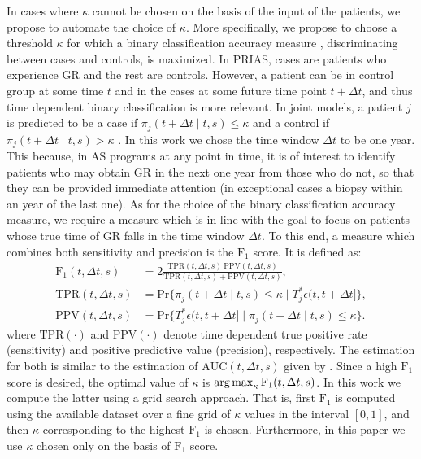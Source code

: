 In cases where $\kappa$ cannot be chosen on the basis of the input of the patients, we propose to automate the choice of $\kappa$. More specifically, we propose to choose a threshold $\kappa$ for which a binary classification accuracy measure \citep{lopez2014optimalcutpoints}, discriminating between cases and controls, is maximized. In PRIAS, cases are patients who experience GR and the rest are controls. However, a patient can be in control group at some time $t$ and in the cases at some future time point $t + \Delta t$, and thus time dependent binary classification is more relevant. In joint models, a patient $j$ is predicted to be a case if $\pi_j(t + \Delta t \mid t,s) \leq \kappa$ and a control if $\pi_j(t + \Delta t \mid t,s) > \kappa$ \citep*{rizopoulosJMbayes, landmarking2017}. In this work we chose the time window $\Delta t$ to be one year. This because, in AS programs at any point in time, it is of interest to identify patients who may obtain GR in the next one year from those who do not, so that they can be provided immediate attention (in exceptional cases a biopsy within an year of the last one). As for the choice of the binary classification accuracy measure, we require a measure which is in line with the goal to focus on patients whose true time of GR falls in the time window $\Delta t$. To this end, a measure which combines both sensitivity and precision is the $\mbox{F}_1$ score. It is defined as:
\begin{align*}
\mbox{F}_1(t, \Delta t, s) &= 2\frac{\mbox{TPR}(t, \Delta t, s)\ \mbox{PPV}(t, \Delta t, s)}{\mbox{TPR}(t, \Delta t, s) + \mbox{PPV}(t, \Delta t, s)},\\
\mbox{TPR}(t, \Delta t, s) &= \mbox{Pr}\big\{\pi_j(t + \Delta t \mid t,s) \leq \kappa \mid T^*_j \epsilon (t, t + \Delta t]\big\},\\
\mbox{PPV}(t, \Delta t, s) &= \mbox{Pr}\big\{T^*_j \epsilon (t, t + \Delta t] \mid \pi_j(t + \Delta t \mid t,s) \leq \kappa \big\}.
\end{align*}
where $\mbox{TPR}(\cdot)$ and $\mbox{PPV}(\cdot)$ denote time dependent true positive rate (sensitivity) and positive predictive value (precision), respectively. The estimation for both is similar to the estimation of $\mbox{AUC}(t, \Delta t, s)$ given by \citet{landmarking2017}. Since a high $\mbox{F}_1$ score is desired, the optimal value of $\kappa$ is $\operatorname{arg\,max}_{\kappa} \mbox{F}_1(t, \Delta t, s)$. In this work we compute the latter using a grid search approach. That is, first $\mbox{F}_1$ is computed using the available dataset over a fine grid of $\kappa$ values in the interval $[0,1]$, and then $\kappa$ corresponding to the highest $\mbox{F}_1$ is chosen. Furthermore, in this paper we use $\kappa$ chosen only on the basis of $\mbox{F}_1$ score.